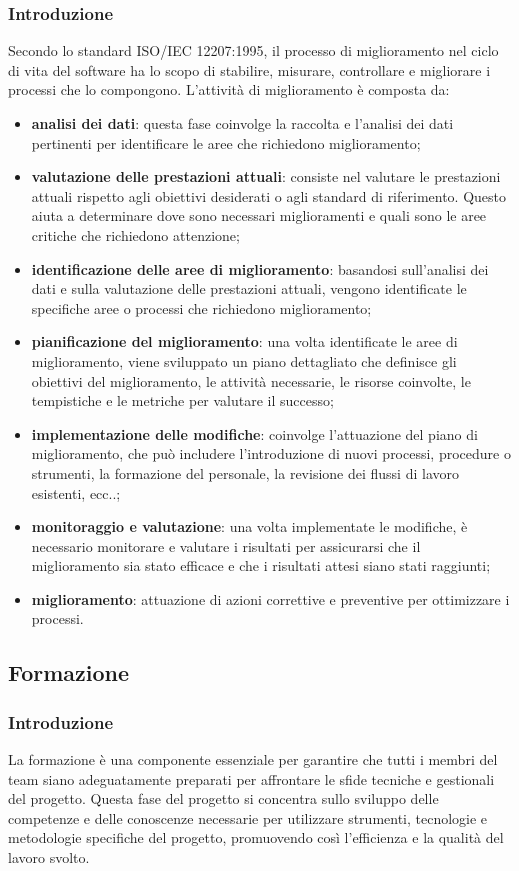 \subsubsection{Introduzione}
Secondo lo standard ISO/IEC 12207:1995, il processo di miglioramento nel ciclo di vita del software ha lo scopo di stabilire, misurare, controllare e migliorare i processi che lo compongono. L’attività di miglioramento è composta da:
\begin{itemize}
    \item \textbf{analisi dei dati}: questa fase coinvolge la raccolta e l'analisi dei dati pertinenti per identificare le aree che richiedono miglioramento;
    \item \textbf{valutazione delle prestazioni attuali}: consiste nel valutare le prestazioni attuali rispetto agli obiettivi desiderati o agli standard di riferimento. Questo aiuta a determinare dove sono necessari miglioramenti e quali sono le aree critiche che richiedono attenzione;
    \item \textbf{identificazione delle aree di miglioramento}: basandosi sull'analisi dei dati e sulla valutazione delle prestazioni attuali, vengono identificate le specifiche aree o processi che richiedono miglioramento;
    \item \textbf{pianificazione del miglioramento}: una volta identificate le aree di miglioramento, viene sviluppato un piano dettagliato che definisce gli obiettivi del miglioramento, le attività necessarie, le risorse coinvolte, le tempistiche e le metriche per valutare il successo;
    \item \textbf{implementazione delle modifiche}: coinvolge l'attuazione del piano di miglioramento, che può includere l'introduzione di nuovi processi, procedure o strumenti, la formazione del personale, la revisione dei flussi di lavoro esistenti, ecc..;
    \item \textbf{monitoraggio e valutazione}: una volta implementate le modifiche, è necessario monitorare e valutare i risultati per assicurarsi che il miglioramento sia stato efficace e che i risultati attesi siano stati raggiunti;
    \item \textbf{miglioramento}: attuazione di azioni correttive e preventive per ottimizzare i processi.
\end{itemize}

\subsection{Formazione}
\subsubsection{Introduzione}
La formazione è una componente essenziale per garantire che tutti i membri del team siano adeguatamente preparati per affrontare le sfide tecniche e gestionali del progetto. Questa fase del progetto si concentra sullo sviluppo delle competenze e delle conoscenze necessarie per utilizzare strumenti, tecnologie e metodologie specifiche del progetto, promuovendo così l'efficienza e la qualità del lavoro svolto.

